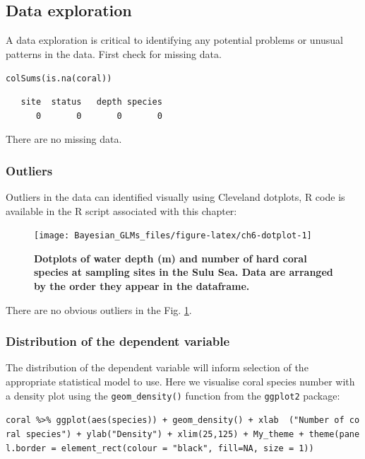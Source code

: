 \documentclass[
]{book}
\begin{document}
\hypertarget{coral-eda}{%
\subsection{Data exploration}\label{coral-eda}}

A data exploration is critical to identifying any potential problems or unusual patterns in the data. First check for missing data.

\texttt{colSums(is.na(coral))}

\begin{verbatim}
   site  status   depth species 
      0       0       0       0 
\end{verbatim}

There are no missing data.

\hypertarget{coral-outliers}{%
\subsubsection{Outliers}\label{coral-outliers}}

Outliers in the data can identified visually using Cleveland dotplots, R code is available in the R script associated with this chapter:



\begin{figure}

{\centering \texttt{[image: Bayesian\_GLMs\_files/figure-latex/ch6-dotplot-1]} 

}

\caption{\textbf{Dotplots of water depth (m) and number of hard coral species at sampling sites in the Sulu Sea. Data are arranged by the order they appear in the dataframe.}}\label{fig:ch6-dotplot}
\end{figure}

There are no obvious outliers in the Fig. \ref{fig:ch6-dotplot}.

\hypertarget{nb-dist}{%
\subsubsection{Distribution of the dependent variable}\label{nb-dist}}

The distribution of the dependent variable will inform selection of the appropriate statistical model to use. Here we visualise coral species number with a density plot using the \texttt{geom\_density()} function from the \texttt{ggplot2} package:

\texttt{coral\ \%\textgreater{}\%\ ggplot(aes(species))\ +\ geom\_density()\ +\ xlab\ \ ("Number\ of\ coral\ species")\ +\ ylab("Density")\ +\ xlim(25,125)\ +\ My\_theme\ +\ theme(panel.border\ =\ element\_rect(colour\ =\ "black",\ fill=NA,\ size\ =\ 1))}
\end{document}
